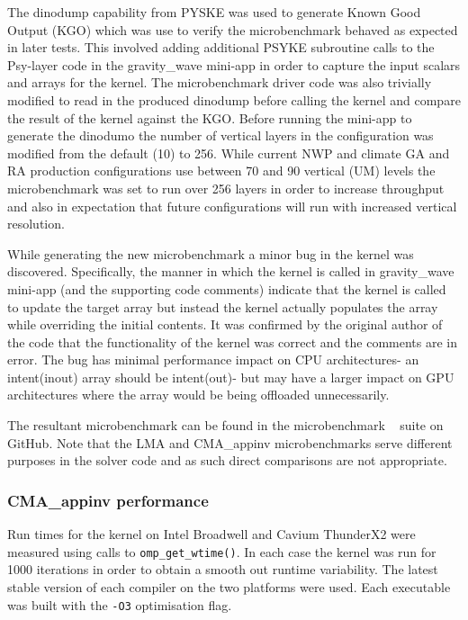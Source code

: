 The dinodump capability from PYSKE was used to generate Known Good Output (KGO) which was use to verify the microbenchmark behaved as expected in later tests.
This involved adding additional PSYKE subroutine calls to the Psy-layer code in the gravity\_wave mini-app in order to capture the input scalars and arrays for the kernel.
The microbenchmark driver code was also trivially modified to read in the produced dinodump before calling the kernel and compare the result of the kernel against the KGO.
Before running the mini-app to generate the dinodumo the number of vertical layers in the configuration was modified from the default (10) to 256.
While current NWP and climate GA and RA production configurations use between 70 and 90 vertical (UM) levels the microbenchmark was set to run over 256 layers in order to increase throughput and also in expectation that future configurations will run with increased vertical resolution.

While generating the new microbenchmark a minor bug in the kernel was discovered.
Specifically, the manner in which the kernel is called in gravity\_wave mini-app (and the supporting code comments) indicate that the kernel is called to update the target array but instead the kernel actually populates the array while overriding the initial contents.
It was confirmed by the original author of the code that the functionality of the kernel was correct and the comments are in error.
The bug has minimal performance impact on CPU architectures- an intent(inout) array should be intent(out)- but may have a larger impact on GPU architectures where the array would be being offloaded unnecessarily. 

The resultant microbenchmark can be found in the microbenchmark ~\cite{lfric-microbenchmarks} suite on GitHub.
Note that the LMA and CMA\_appinv microbenchmarks serve different purposes in the solver code and as such direct comparisons are not appropriate.

\subsubsection{CMA\_appinv performance}

Run times for the kernel on Intel Broadwell and Cavium ThunderX2 were measured using calls to \verb+omp_get_wtime()+.
In each case the kernel was run for 1000 iterations in order to obtain a smooth out runtime variability.
The latest stable version of each compiler on the two platforms were used.
Each executable was built with the \verb+-O3+ optimisation flag.

